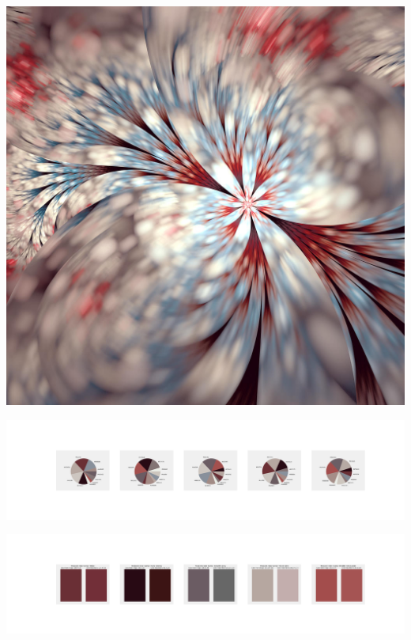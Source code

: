 \documentclass[11pt]{article}
\begin{document}
\begin{landscape}
    \begin{center}
    \includegraphics[width=\textwidth]{./nbimg/file (279).jpg}
    \end{center}

    \begin{center}
    \includegraphics[width=250mm]{./nbimg/pie-199.jpg}
    \end{center}

    \begin{center}
    \includegraphics[width=250mm]{./nbimg/peak-199.jpg}
    \end{center}
    


\end{landscape}
\end{document}
